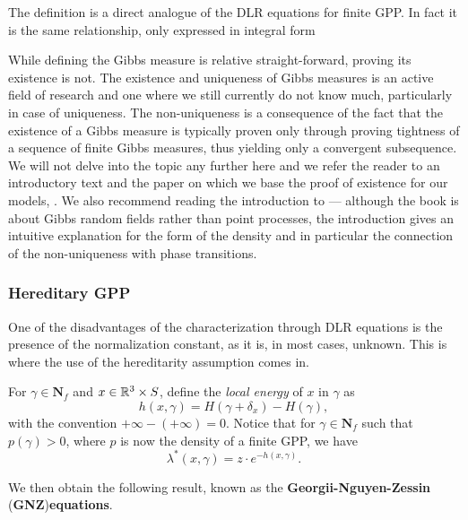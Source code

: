 The definition is a direct analogue of the DLR equations for finite GPP. In fact it is the same relationship, only expressed in integral form 

While defining the Gibbs measure is relative straight-forward, proving its existence is not. The existence and uniqueness of Gibbs measures is an active field of research and one where we still currently do not know much, particularly in case of uniqueness. The non-uniqueness is a consequence of the fact that the existence of a Gibbs measure is typically proven only through proving tightness of a sequence of finite Gibbs measures, thus yielding only a convergent subsequence. We will not delve into the topic any further here and we refer the reader to an introductory text \cite{Dereudre2017} and the paper on which we base the proof of existence for our models, \cite{DDG12}. We also recommend reading the introduction to \cite{Georgii2011} --- although the book is about Gibbs random fields rather than point processes, the introduction gives an intuitive explanation for the form of the density and in particular the connection of the non-uniqueness with phase transitions.


\subsubsection{Hereditary GPP}
One of the disadvantages of the characterization through DLR equations is the presence of the normalization constant, as it is, in most cases, unknown. This is where the use of the hereditarity assumption comes in. 

For $\gamma \in \mathbf N_f$ and $x \in {\mathbb R^3}\times S$, define the \textit{local energy} of $x$ in $\gamma$ as
$$h(x,\gamma) = H(\gamma + \delta_x) - H(\gamma),$$
with the convention $+\infty - (+\infty) = 0$. Notice that for $\gamma \in \mathbf N_f$ such that $p(\gamma) > 0$, where $p$ is now the density of a finite GPP, we have
$$\lambda^*(x,\gamma) = z \cdot e^{-h(x,\gamma)}.$$

We then obtain the following result, known as the \textbf{Georgii-Nguyen-Zessin }(\textbf{GNZ})\textbf{equations}. 

